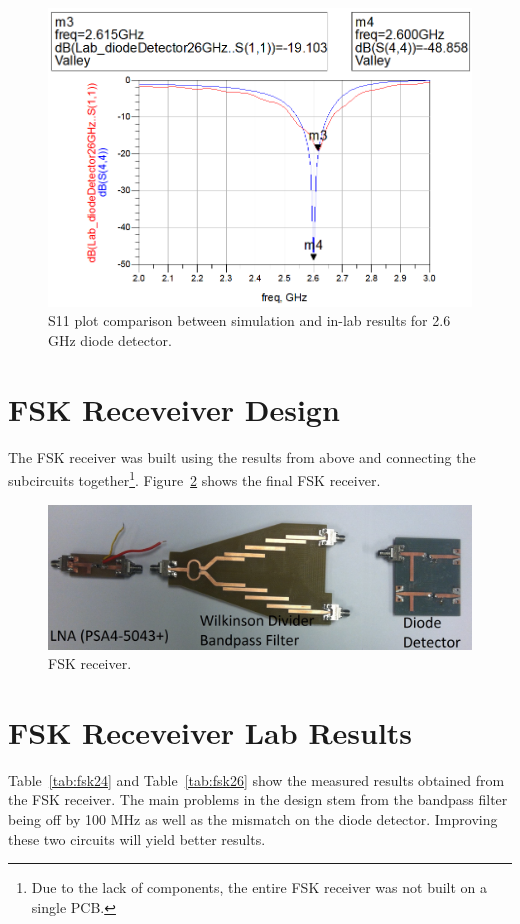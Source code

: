 \documentclass[conference]{IEEEtran}
\begin{document}
\begin{figure}[!htb]
\centering
\includegraphics[scale=0.4]{diode-pics/diodedetectorLab26S11.png}
\caption{S11 plot comparison between simulation and in-lab results for 2.6 GHz diode detector.}
\label{fig:resultS1126}
\end{figure}

\section{FSK Receveiver Design}
The FSK receiver was built using the results from above and connecting the subcircuits together\footnote{Due to the lack of components, the entire FSK receiver was not built on a single PCB.}.  Figure~\ref{fig:fsk} shows the final FSK receiver.

\begin{figure}[!htb]
\centering
\includegraphics[scale=0.1]{fsk.jpg}
\caption{FSK receiver.}
\label{fig:fsk}
\end{figure}

\section{FSK Receveiver Lab Results}
Table~\ref{tab:fsk24} and Table~\ref{tab:fsk26} show the measured results obtained from the FSK receiver.  The main problems in the design stem from the bandpass filter being off by 100 MHz as well as the mismatch on the diode detector.  Improving these two circuits will yield better results.
\end{document}
